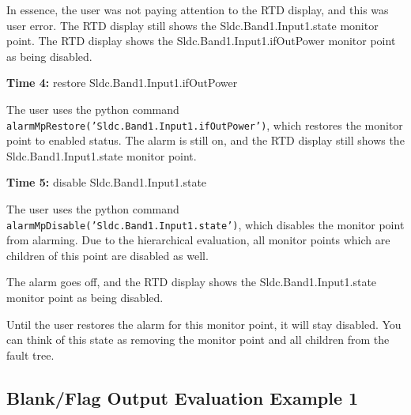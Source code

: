 \documentclass[letterpaper,12pt,oneside,pdftex]{article}
\newcommand{\mytime}[2]{\textbf{Time #1:} #2}
\begin{document}
In essence, the user was not paying attention to the RTD display, and this was
user error. The RTD display still shows the Sldc.Band1.Input1.state monitor
point. The RTD display shows the Sldc.Band1.Input1.ifOutPower monitor point as
being disabled.

\mytime{4}{restore Sldc.Band1.Input1.ifOutPower}

The user uses the python command
\texttt{alarmMpRestore('Sldc.Band1.Input1.ifOutPower')}, which restores the
monitor point to enabled status. The alarm is still on, and the RTD display
still shows the Sldc.Band1.Input1.state monitor point.

\mytime{5}{disable Sldc.Band1.Input1.state}

The user uses the python command
\texttt{alarmMpDisable('Sldc.Band1.Input1.state')}, which disables the
monitor point from alarming. Due to the hierarchical evaluation, all monitor
points which are children of this point are disabled as well.

The alarm goes off, and the RTD display shows the Sldc.Band1.Input1.state
monitor point as being disabled.

Until the user restores the alarm for this monitor point, it will stay disabled.
You can think of this state as removing the monitor point and all children from
the fault tree.


\subsection{Blank/Flag Output Evaluation Example 1}
\label{bfoutput-example1}
\end{document}
